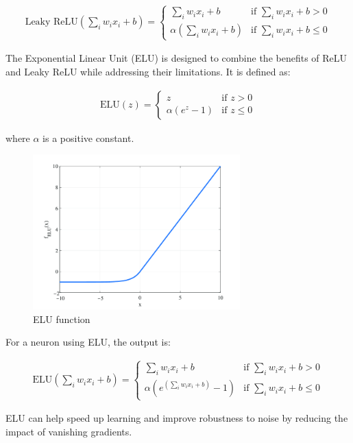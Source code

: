 \begin{align}
  \text{Leaky ReLU}(\sum_i w_i x_i + b) = \begin{cases}
    \sum_i w_i x_i + b & \text{if } \sum_i w_i x_i + b > 0 \\
    \alpha (\sum_i w_i x_i + b) & \text{if } \sum_i w_i x_i + b \leq 0
  \end{cases}
\end{align}

The Exponential Linear Unit (ELU) is designed to combine the benefits of ReLU and Leaky ReLU while addressing their limitations.
It is defined as:

\begin{align}
  \text{ELU}(z) = \begin{cases}
    z & \text{if } z > 0 \\
    \alpha (e^z - 1) & \text{if } z \leq 0
  \end{cases}
\end{align}

where \( \alpha \) is a positive constant.

\begin{figure}[H]
  \centering
  \includegraphics[width=80mm]{figures/elu.png}
  \caption{ELU function \cite{Sheng_2021}}
  \label{elu}
\end{figure}
For a neuron using ELU, the output is:

\begin{align}
  \text{ELU}(\sum_i w_i x_i + b) = \begin{cases}
    \sum_i w_i x_i + b & \text{if } \sum_i w_i x_i + b > 0 \\
    \alpha (e^{(\sum_i w_i x_i + b)} - 1) & \text{if } \sum_i w_i x_i + b \leq 0
  \end{cases}
\end{align}

ELU can help speed up learning and improve robustness to noise by reducing the impact of vanishing gradients.

